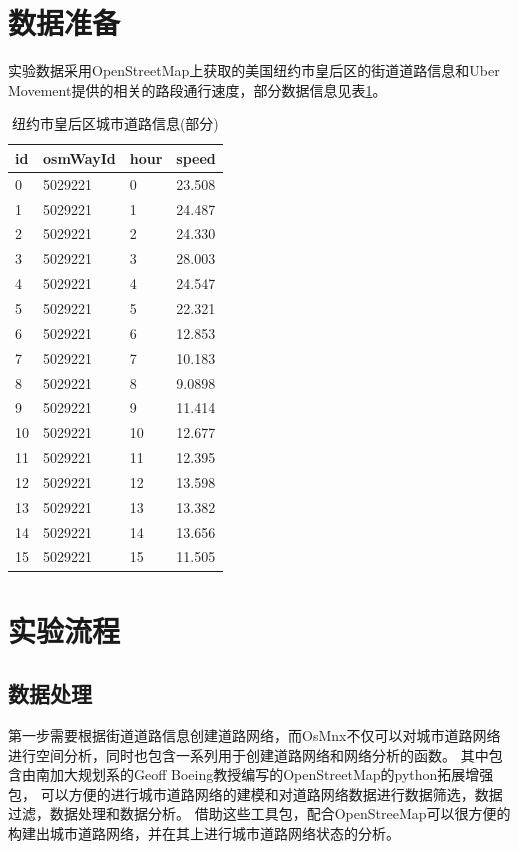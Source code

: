 \section{数据准备}\label{sec:数据准备}
实验数据采用OpenStreetMap上获取的美国纽约市皇后区的街道道路信息和Uber Movement提供的相关的路段通行速度，部分数据信息见表\ref{tab:table}。
\begin{table}[H]
    \begin{center}
        \caption{纽约市皇后区城市道路信息(部分)}\label{tab:table}
        \begin{tabular}{llll}
            \hline
            id & osmWayId & hour & speed  \\
            \hline
            0  & 5029221  & 0    & 23.508 \\
            1  & 5029221  & 1    & 24.487 \\
            2  & 5029221  & 2    & 24.330 \\
            3  & 5029221  & 3    & 28.003 \\
            4  & 5029221  & 4    & 24.547 \\
            5  & 5029221  & 5    & 22.321 \\
            6  & 5029221  & 6    & 12.853 \\
            7  & 5029221  & 7    & 10.183 \\
            8  & 5029221  & 8    & 9.0898 \\
            9  & 5029221  & 9    & 11.414 \\
            10 & 5029221  & 10   & 12.677 \\
            11 & 5029221  & 11   & 12.395 \\
            12 & 5029221  & 12   & 13.598 \\
            13 & 5029221  & 13   & 13.382 \\
            14 & 5029221  & 14   & 13.656 \\
            15 & 5029221  & 15   & 11.505 \\
            \hline
        \end{tabular}
    \end{center}
\end{table}


\section{实验流程}\label{sec:实验流程}

\subsection{数据处理}\label{subsec:数据处理}
第一步需要根据街道道路信息创建道路网络，而OsMnx不仅可以对城市道路网络进行空间分析，同时也包含一系列用于创建道路网络和网络分析的函数。
其中包含由南加大规划系的Geoff Boeing教授编写的OpenStreetMap的python拓展增强包，
可以方便的进行城市道路网络的建模和对道路网络数据进行数据筛选，数据过滤，数据处理和数据分析。
借助这些工具包，配合OpenStreeMap可以很方便的构建出城市道路网络，并在其上进行城市道路网络状态的分析。


